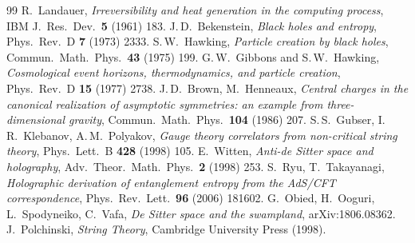 \begin{thebibliography}{99}
 R.~Landauer, \emph{Irreversibility and heat generation in the computing process}, IBM J.\ Res.\ Dev.\ \textbf{5} (1961) 183.
 J.\,D.~Bekenstein, \emph{Black holes and entropy}, Phys.\ Rev.\ D \textbf{7} (1973) 2333.
 S.\,W.~Hawking, \emph{Particle creation by black holes}, Commun.\ Math.\ Phys.\ \textbf{43} (1975) 199.
 G.\,W.~Gibbons and S.\,W.~Hawking, \emph{Cosmological event horizons, thermodynamics, and particle creation}, Phys.\ Rev.\ D \textbf{15} (1977) 2738.
 J.\,D.~Brown, M.~Henneaux, \emph{Central charges in the canonical realization of asymptotic symmetries: an example from three-dimensional gravity}, Commun.\ Math.\ Phys.\ \textbf{104} (1986) 207.
 S.\,S.~Gubser, I.\,R.~Klebanov, A.\,M.~Polyakov, \emph{Gauge theory correlators from non-critical string theory}, Phys.\ Lett.\ B \textbf{428} (1998) 105.
 E.~Witten, \emph{Anti-de Sitter space and holography}, Adv.\ Theor.\ Math.\ Phys.\ \textbf{2} (1998) 253.
 S.~Ryu, T.~Takayanagi, \emph{Holographic derivation of entanglement entropy from the AdS/CFT correspondence}, Phys.\ Rev.\ Lett.\ \textbf{96} (2006) 181602.
 G.~Obied, H.~Ooguri, L.~Spodyneiko, C.~Vafa, \emph{De Sitter space and the swampland}, arXiv:1806.08362.
 J.~Polchinski, \emph{String Theory}, Cambridge University Press (1998).


\end{thebibliography}
